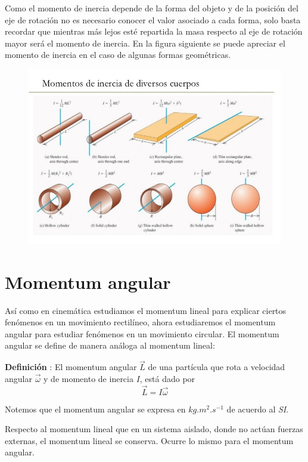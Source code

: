\documentclass[letterpaper]{article}
\newcounter{definiciones}
\newcommand{\defii}{\stepcounter{definiciones} \textbf{Definición \thedefiniciones}: }
\newenvironment{defi}{\begin{framed} \defii}{\end{framed}}
\begin{document}
Como el momento de inercia depende de la forma del objeto y de la posición del eje de rotación no es necesario conocer el valor asociado a cada forma, solo basta recordar que mientras más lejos esté repartida la masa respecto al eje de rotación mayor será el momento de inercia. En la figura siguiente se puede apreciar el momento de inercia en el caso de algunas formas geométricas.

\begin{figure}[h]
\centering
\includegraphics[scale=0.4]{momentos_de_inercia.jpg}
\end{figure}
                        
\section*{Momentum angular}

Así como en cinemática estudiamos el momentum lineal para explicar ciertos fenómenos en un movimiento rectilíneo, ahora estudiaremos el momentum angular para estudiar fenómenos en un movimiento circular. El momentum angular se define de manera análoga al momentum lineal:

\begin{defi}
El momentum angular $\vec{L}$ de una partícula que rota a velocidad angular $\vec{\omega}$ y de momento de inercia $I$, está dado por
$$\vec{L} = I\vec{\omega}$$

Notemos que el momentum angular se expresa en $\si{kg.m^2.s^{-1}}$ de acuerdo al \emph{SI}. 
\end{defi}

Respecto al momentum lineal que en un sistema aislado, donde no actúan fuerzas externas, el momentum lineal se conserva. Ocurre lo mismo para el momentum angular.
\end{document}
